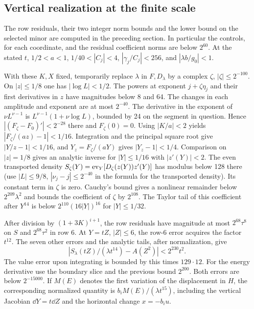 \subsection{Vertical realization at the finite scale}
The row residuals, their two integer norm bounds and the lower bound on the selected minor are computed in the preceding section. In particular the controls, for each coordinate, and the residual coefficient norms are below \(2^{60}\). At the stated \(t\), \(1/2<a<1\), \(1/40<|C_j|<4\), \(|\gamma_j/C_j|<256\), and \(|\lambda b/g_0|<1\).

With these \(K,X\) fixed, temporarily replace \(\lambda\) in \(F,D_\lambda\)
by a complex \(\zeta\), \(|\zeta|\le2^{-100}\). On \(|z|\le1/8\) one has
\(|\log L|<1/2\). The powers at exponent \(j+\zeta\eta_j\) and their
first derivatives in \(z\) have magnitudes below 8 and 64. The changes
in each amplitude and exponent are at most \(2^{-40}\).
The derivative in the exponent of \(\nu L^{\nu-1}\) is
\(L^{\nu-1}(1+\nu\log L)\), bounded by 24 on the segment in question.
Hence \(|(F_\zeta-F_0)'|<2^{-28}\) there and \(F_\zeta(0)=0\). Using
\(|K/a|<2\) yields \(|F_\zeta/(az)-1|<1/16\). Integration and the
principal square root give \(|Y/z-1|<1/16\), and \(Y_z=F_\zeta/(aY)\)
gives \(|Y_z-1|<1/4\). Comparison on \(|z|=1/8\) gives an analytic inverse
for \(|Y|\le1/16\) with \(|z'(Y)|<2\). The even transported density
\(S_\zeta(Y)=\operatorname{ev}_Y[D_\zeta(z(Y))z'(Y)]\) has modulus below 128 there
(use \(|L|\le9/8\), \(|\nu_j-j|\le2^{-40}\) in the formula for the transported density). Its constant
term in \(\zeta\) is zero. Cauchy's bound gives a nonlinear remainder
below \(2^{209}\lambda^2\) and bounds the coefficient of \(\zeta\) by
\(2^{108}\). The Taylor tail of this coefficient after \(Y^{14}\) is below
\(2^{110}(16|Y|)^{16}\) for \(|Y|\le1/32\).

After division by \((1+3K)^{i+1}\), the row residuals have magnitude at
most \(2^{68}\tau^8\) on \(S\) and \(2^{68}\tau^2\) in row 6.
At \(Y=tZ\), \(|Z|\le6\), the row-6 error acquires the factor \(t^{12}\).
The seven other errors and the analytic tails, after normalization, give
\begin{equation}
 \left|S_\lambda(tZ)/(\lambda t^{14})-A(Z^2)\right|<2^{230}t^2.
 \label{fin:verticalerror}
\end{equation}
The value error upon integrating is bounded by this times \(129\cdot12\).
For the energy derivative use the boundary slice and the previous bound
\(2^{200}\). Both errors are below \(2^{-15000}\). If \(M(E)\) denotes the
first variation of the displacement in \(H\), the corresponding normalized
quantity is \(b_iM(E)/(\lambda t^{15})\), including the vertical Jacobian
\(\dd Y=t\dd Z\) and the horizontal change \(x=-b_i u\).

